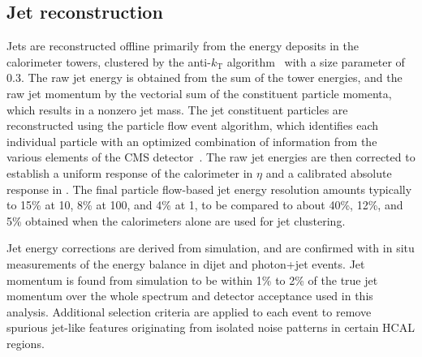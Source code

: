 
\subsection{Jet reconstruction}
Jets are reconstructed offline primarily from the energy deposits in the calorimeter towers, clustered by the anti-$k_\mathrm{T}$ algorithm~\cite{Cacciari:2008gp, Cacciari:2011ma} with a size parameter of 0.3. The raw jet energy is obtained from the sum of the tower energies, and the raw jet momentum by the vectorial sum of the constituent particle momenta, which results in a nonzero jet mass. The jet constituent particles are reconstructed using the particle flow event algorithm, which identifies each individual particle with an optimized combination of information from the various elements of the CMS detector~\cite{CMS-PAS-PFT-09-001}.  The raw jet energies are then corrected to establish a uniform response of the calorimeter in $\eta$ and a calibrated absolute response in \pt. The final particle flow-based jet energy resolution amounts typically to 15\% at 10\GeV, 8\% at 100\GeV, and 4\% at 1\TeV, to be compared to about 40\%, 12\%, and 5\% obtained when the calorimeters alone are used for jet clustering. 

Jet energy corrections are derived from simulation, and are confirmed with in situ measurements of the energy balance in dijet and photon+jet events. Jet momentum is found from simulation to be within 1\% to 2\% of the true jet momentum over the whole \pt spectrum and detector acceptance used in this analysis. Additional selection criteria are applied to each event to remove spurious jet-like features originating from isolated noise patterns in certain HCAL regions. 

